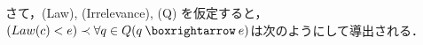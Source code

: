 \documentclass[dvipdfmx,twoside,11pt,uplatex]{jsarticle}
\theoremstyle{definition}
\newtheorem{prop}{命題}
\begin{document}
さて，(Law), (Irrelevance), (Q) を仮定すると，$(Law(c) < e) \prec \forall q\in Q ( q \necif e )$は次のようにして導出される．

\end{document}
